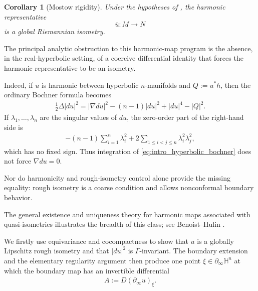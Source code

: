 \documentclass[11pt]{amsart}
\theoremstyle{plain}
\newtheorem{corollary}[theorem]{Corollary}
\theoremstyle{plain}
\theoremstyle{plain}
\newcommand{\Hn}{\mathbb H^n}
\newcommand{\bdry}{\partial_\infty}
\numberwithin{equation}{section}
\begin{document}
\begin{corollary}[Mostow rigidity]\label{cor:mostow}
Under the hypotheses of , the harmonic representative
\[
\bar u:M\longrightarrow N
\]
is a global Riemannian isometry.  
\end{corollary}

The principal analytic obstruction to this harmonic-map program is the
absence, in the real-hyperbolic setting, of a coercive differential
identity that forces the harmonic representative to be an isometry.

Indeed, if \(u\) is harmonic between hyperbolic
\(n\)-manifolds and \(Q:=u^*h\), then the ordinary Bochner formula becomes
\begin{align}
\frac12\Delta |du|^2
=
|\nabla du|^2
-(n-1)|du|^2
+|du|^4-|Q|^2.
\label{eq:intro_hyperbolic_bochner}
\end{align}
If \(\lambda_1,\dots,\lambda_n\) are the singular values of \(du\), the
zero-order part of the right-hand side is
\begin{align}
-(n-1)\sum_{i=1}^n\lambda_i^2
+2\sum_{1\leq i<j\leq n}\lambda_i^2\lambda_j^2,
\nonumber
\end{align}
which has no fixed sign.  Thus integration of
\eqref{eq:intro_hyperbolic_bochner} does not force
\(\nabla du=0\).  



Nor do harmonicity and rough-isometry control alone
provide the missing equality: rough isometry is a coarse condition and
allows nonconformal boundary behavior.  

The general existence and
uniqueness theory for harmonic maps associated with quasi-isometries
illustrates the breadth of this class; see Benoist--Hulin
\cite[Theorem~1.1 and Fact~1.4]{BenoistHulin}.




We firstly use equivariance and cocompactness to
show that \(u\) is a globally Lipschitz rough isometry and that
\(|du|^2\) is \(\Gamma\)-invariant.  The boundary extension and the
elementary regularity argument then produce one point
\(\xi\in\partial_\infty\Hn\) at which the boundary map has an invertible
differential
\begin{align}
A:=D(\bdry u)_\xi.
\nonumber
\end{align}
\end{document}
